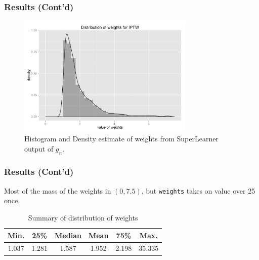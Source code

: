 \documentclass{beamer}
\begin{document}
\begin{frame}
\frametitle{Results (Cont'd)}
\begin{figure}
\centering
\includegraphics[width=0.75\textwidth]{density-plot_ghat.pdf}
\caption{Histogram and Density estimate of weights from SuperLearner output of $g_n$.}
\end{figure}
\end{frame}

\begin{frame}
\frametitle{Results (Cont'd)}
Most of the mass of the weights in $(0,7.5)$, but \texttt{weights} takes on value over 25 once.
\begin{table}[ht]
\centering
\begin{tabular}{cccccc}
  \hline
 Min. & 25\% & Median & Mean & 75\% & Max. \\ 
  \hline
 1.037   & 1.281   & 1.587   & 1.952   &  2.198   &  35.335   \\ 
   \hline
\end{tabular}
\caption{Summary of distribution of weights} 
\end{table}
\end{frame}
\end{document}
